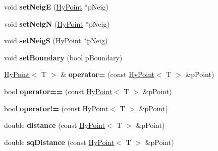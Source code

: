 \begin{DoxyCompactItemize}
\item 
\hypertarget{classHyPoint_acaacdb655b793db593a7ffd968fe8ea4}{
void {\bfseries setNeigE} (\hyperlink{classHyPoint}{HyPoint} $\ast$pNeig)}
\label{classHyPoint_acaacdb655b793db593a7ffd968fe8ea4}

\item 
\hypertarget{classHyPoint_a851718a6acc6e5256bad58197a3821b3}{
void {\bfseries setNeigN} (\hyperlink{classHyPoint}{HyPoint} $\ast$pNeig)}
\label{classHyPoint_a851718a6acc6e5256bad58197a3821b3}

\item 
\hypertarget{classHyPoint_ad3118592f2de1c104ebd9c0e417f59d5}{
void {\bfseries setNeigS} (\hyperlink{classHyPoint}{HyPoint} $\ast$pNeig)}
\label{classHyPoint_ad3118592f2de1c104ebd9c0e417f59d5}

\item 
\hypertarget{classHyPoint_ab397f4700d45568e1e1bd07010d35704}{
void {\bfseries setBoundary} (bool pBoundary)}
\label{classHyPoint_ab397f4700d45568e1e1bd07010d35704}

\item 
\hypertarget{classHyPoint_adec1f5535f3b40fa16980969df05b87c}{
\hyperlink{classHyPoint}{HyPoint}$<$ T $>$ \& {\bfseries operator=} (const \hyperlink{classHyPoint}{HyPoint}$<$ T $>$ \&pPoint)}
\label{classHyPoint_adec1f5535f3b40fa16980969df05b87c}

\item 
\hypertarget{classHyPoint_aa7f50007090adfd1733276951cb05983}{
bool {\bfseries operator==} (const \hyperlink{classHyPoint}{HyPoint}$<$ T $>$ \&pPoint)}
\label{classHyPoint_aa7f50007090adfd1733276951cb05983}

\item 
\hypertarget{classHyPoint_ad7adaa5c49d54fe6ba0dbb9024a9c6eb}{
bool {\bfseries operator!=} (const \hyperlink{classHyPoint}{HyPoint}$<$ T $>$ \&pPoint)}
\label{classHyPoint_ad7adaa5c49d54fe6ba0dbb9024a9c6eb}

\item 
\hypertarget{classHyPoint_a5be21cb2e4a3e1d3779247c2391e1f07}{
double {\bfseries distance} (const \hyperlink{classHyPoint}{HyPoint}$<$ T $>$ \&pPoint)}
\label{classHyPoint_a5be21cb2e4a3e1d3779247c2391e1f07}

\item 
\hypertarget{classHyPoint_ac18ecf354862fb870aa3957c94c22eb9}{
double {\bfseries sqDistance} (const \hyperlink{classHyPoint}{HyPoint}$<$ T $>$ \&pPoint)}
\label{classHyPoint_ac18ecf354862fb870aa3957c94c22eb9}

\end{DoxyCompactItemize}

